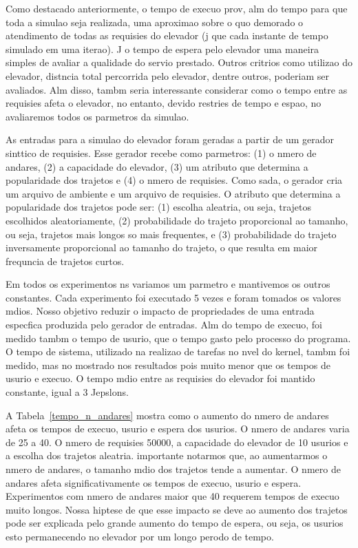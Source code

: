 \documentclass[12pt]{article}
\begin{document}
Como destacado anteriormente, o tempo de execuo prov, alm do tempo para que toda a simulao seja realizada, uma aproximao sobre o quo demorado  o atendimento de todas as requisies do elevador (j que cada instante de tempo  simulado em uma iterao). J o tempo de espera pelo elevador  uma maneira simples de avaliar a qualidade do servio prestado. Outros critrios como utilizao do elevador, distncia total percorrida pelo elevador, dentre outros, poderiam ser avaliados. Alm disso, tambm seria interessante considerar como o tempo entre as requisies afeta o elevador, no entanto, devido  restries de tempo e espao, no avaliaremos todos os parmetros da simulao.

As entradas para a simulao do elevador foram geradas a partir de um gerador sinttico de requisies. Esse gerador recebe como parmetros: (1) o nmero de andares, (2) a capacidade do elevador, (3) um atributo que determina a popularidade dos trajetos e (4) o nmero de requisies. Como sada, o gerador cria um arquivo de ambiente e um arquivo de requisies. O atributo que determina a popularidade dos trajetos pode ser: (1) escolha aleatria, ou seja, trajetos escolhidos aleatoriamente, (2) probabilidade do trajeto proporcional ao tamanho, ou seja, trajetos mais longos so mais frequentes, e (3) probabilidade do trajeto inversamente proporcional ao tamanho do trajeto, o que resulta em maior frequncia de trajetos curtos.

Em todos os experimentos ns variamos um parmetro e mantivemos os outros constantes. Cada experimento foi executado 5 vezes e foram tomados os valores mdios. Nosso objetivo  reduzir o impacto de propriedades de uma entrada especfica produzida pelo gerador de entradas.  Alm do tempo de execuo, foi medido tambm o tempo de usurio, que  o tempo gasto pelo processo do programa. O tempo de sistema, utilizado na realizao de tarefas no nvel do kernel, tambm foi medido, mas no  mostrado nos resultados pois  muito menor que os tempos de usurio e execuo. O tempo mdio entre as requisies do elevador foi mantido constante, igual a 3 Jepslons.

A Tabela~\ref{tempo_n_andares} mostra como o aumento do nmero de andares afeta os tempos de  execuo, usurio e espera dos usurios. O nmero de andares varia de 25 a 40. O nmero de requisies  50000, a capacidade do elevador  de 10 usurios e a escolha dos trajetos  aleatria.  importante notarmos que, ao aumentarmos o nmero de andares, o tamanho mdio dos trajetos tende a aumentar. O nmero de andares afeta significativamente os tempos de execuo, usurio e espera. Experimentos com nmero de andares maior que 40 requerem tempos de execuo muito longos. Nossa hiptese de que esse impacto se deve ao aumento dos trajetos pode ser explicada pelo grande aumento do tempo de espera, ou seja, os usurios esto permanecendo no elevador por um longo perodo de tempo.
\end{document}
